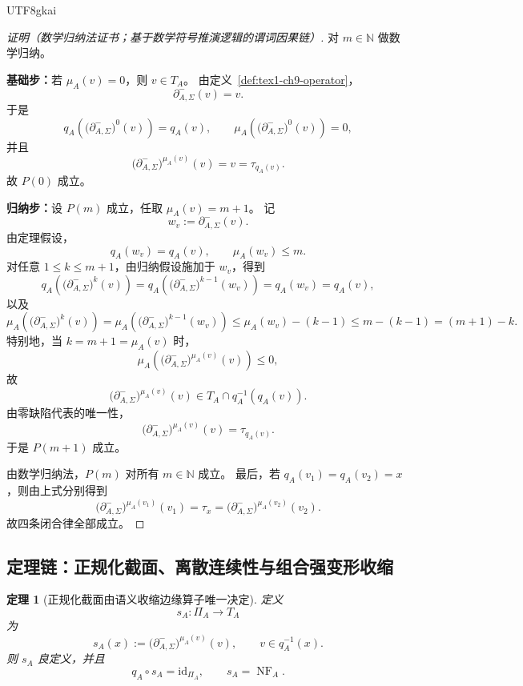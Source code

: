 \documentclass[12pt]{article}
\newtheorem{theorem}{定理}[section]
\newcommand{\NN}{\mathbb{N}}
\newcommand{\id}{\mathrm{id}}
\begin{document}
\begin{CJK*}{UTF8}{gkai}
\begin{proof}[证明（数学归纳法证书；基于数学符号推演逻辑的谓词因果链）]
对 \(m\in\NN\) 做数学归纳。

\textbf{基础步：}若 \(\mu_A(v)=0\)，则 \(v\in T_A\)。
由定义~\ref{def:tex1-ch9-operator}，
\[
  \partial^-_{A,\Sigma}(v)=v.
\]
于是
\[
  q_A\!\left(
    \bigl(\partial^-_{A,\Sigma}\bigr)^0(v)
  \right)=q_A(v),
  \qquad
  \mu_A\!\left(
    \bigl(\partial^-_{A,\Sigma}\bigr)^0(v)
  \right)=0,
\]
并且
\[
  \bigl(\partial^-_{A,\Sigma}\bigr)^{\mu_A(v)}(v)=v=\tau_{q_A(v)}.
\]
故 \(P(0)\) 成立。

\textbf{归纳步：}设 \(P(m)\) 成立，任取 \(\mu_A(v)=m+1\)。
记
\[
  w_v:=\partial^-_{A,\Sigma}(v).
\]
由定理假设，
\[
  q_A(w_v)=q_A(v),
  \qquad
  \mu_A(w_v)\le m.
\]
对任意 \(1\le k\le m+1\)，由归纳假设施加于 \(w_v\)，得到
\[
  q_A\!\left(
    \bigl(\partial^-_{A,\Sigma}\bigr)^k(v)
  \right)
  =
  q_A\!\left(
    \bigl(\partial^-_{A,\Sigma}\bigr)^{k-1}(w_v)
  \right)
  =
  q_A(w_v)
  =
  q_A(v),
\]
以及
\[
  \mu_A\!\left(
    \bigl(\partial^-_{A,\Sigma}\bigr)^k(v)
  \right)
  =
  \mu_A\!\left(
    \bigl(\partial^-_{A,\Sigma}\bigr)^{k-1}(w_v)
  \right)
  \le
  \mu_A(w_v)-(k-1)
  \le
  m-(k-1)
  =
  (m+1)-k.
\]
特别地，当 \(k=m+1=\mu_A(v)\) 时，
\[
  \mu_A\!\left(
    \bigl(\partial^-_{A,\Sigma}\bigr)^{\mu_A(v)}(v)
  \right)
  \le 0,
\]
故
\[
  \bigl(\partial^-_{A,\Sigma}\bigr)^{\mu_A(v)}(v)\in T_A\cap q_A^{-1}(q_A(v)).
\]
由零缺陷代表的唯一性，
\[
  \bigl(\partial^-_{A,\Sigma}\bigr)^{\mu_A(v)}(v)=\tau_{q_A(v)}.
\]
于是 \(P(m+1)\) 成立。

由数学归纳法，\(P(m)\) 对所有 \(m\in\NN\) 成立。
最后，若 \(q_A(v_1)=q_A(v_2)=x\)，则由上式分别得到
\[
  \bigl(\partial^-_{A,\Sigma}\bigr)^{\mu_A(v_1)}(v_1)=\tau_x
  =
  \bigl(\partial^-_{A,\Sigma}\bigr)^{\mu_A(v_2)}(v_2).
\]
故四条闭合律全部成立。
\end{proof}

\subsection{定理链：正规化截面、离散连续性与组合强变形收缩}
\label{subsec:tex1-ch9-theorems}

\begin{theorem}[正规化截面由语义收缩边缘算子唯一决定]
\label{thm:tex1-ch9-section}
定义
\[
  s_A:\Pi_A\to T_A
\]
为
\[
  s_A(x)
  :=
  \bigl(\partial^-_{A,\Sigma}\bigr)^{\mu_A(v)}(v),
  \qquad
  v\in q_A^{-1}(x).
\]
则 \(s_A\) 良定义，并且
\[
  q_A\circ s_A=\id_{\Pi_A},
  \qquad
  s_A=\operatorname{NF}_A.
\]
\end{theorem}


\end{CJK*}
\end{document}
